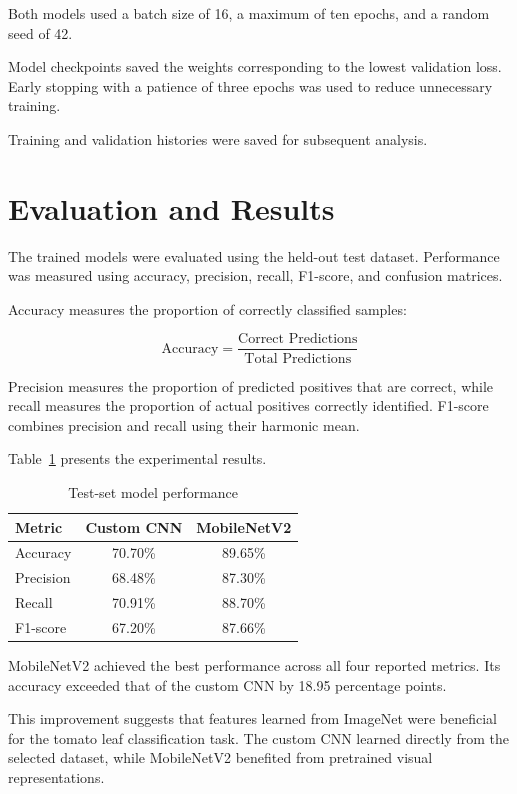 \documentclass[12pt,a4paper]{article}
\begin{document}
Both models used a batch size of 16, a maximum of ten epochs, and a random seed of 42.

Model checkpoints saved the weights corresponding to the lowest validation loss. Early stopping with a patience of three epochs was used to reduce unnecessary training.

Training and validation histories were saved for subsequent analysis.

\section{Evaluation and Results}

The trained models were evaluated using the held-out test dataset. Performance was measured using accuracy, precision, recall, F1-score, and confusion matrices.

Accuracy measures the proportion of correctly classified samples:

\begin{equation}
\text{Accuracy} =
\frac{\text{Correct Predictions}}{\text{Total Predictions}}
\end{equation}

Precision measures the proportion of predicted positives that are correct, while recall measures the proportion of actual positives correctly identified. F1-score combines precision and recall using their harmonic mean.

Table~\ref{tab:results} presents the experimental results.

\begin{table}[H]
\centering
\caption{Test-set model performance}
\label{tab:results}
\begin{tabular}{lcc}
\toprule
Metric & Custom CNN & MobileNetV2\\
\midrule
Accuracy & 70.70\% & 89.65\%\\
Precision & 68.48\% & 87.30\%\\
Recall & 70.91\% & 88.70\%\\
F1-score & 67.20\% & 87.66\%\\
\bottomrule
\end{tabular}
\end{table}

MobileNetV2 achieved the best performance across all four reported metrics. Its accuracy exceeded that of the custom CNN by 18.95 percentage points.

This improvement suggests that features learned from ImageNet were beneficial for the tomato leaf classification task. The custom CNN learned directly from the selected dataset, while MobileNetV2 benefited from pretrained visual representations.
\end{document}
